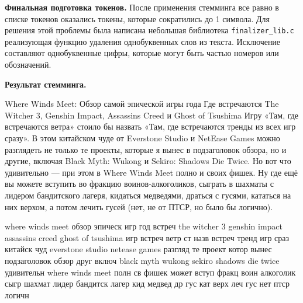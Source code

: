 \vspace{2em}
\noindent\textbf{Финальная подготовка токенов.} После применения стемминга все равно в списке токенов оказались токены, которые сократились до 1 символа. Для решения этой проблемы была написана небольшая библиотека \texttt{finalizer\_lib.c} реализующая функцию удаления однобуквенных слов из текста. Исключение составляют однобуквенные цифры, которые могут быть частью номеров или обозначений.

\vspace{2em}
\noindent\textbf{Результат стемминга.}
\begin{tcolorbox}[colback=blue!5!white,colframe=blue!75!black]
Where Winds Meet: Обзор самой эпической игры года Где встречаются The Witcher 3, Genshin Impact, Assassins Creed и Ghost of Tsushima Игру «Там, где встречаются ветра» стоило бы назвать «Там, где встречаются тренды из всех игр сразу». В этом китайском чуде от Everstone Studio и NetEase Games можно разглядеть не только те проекты, которые я вынес в подзаголовок обзора, но и другие, включая Black Myth: Wukong и Sekiro: Shadows Die Twice. Но вот что удивительно — при этом в Where Winds Meet полно и своих фишек. Ну где ещё вы можете вступить во фракцию воинов-алкоголиков, сыграть в шахматы с лидером бандитского лагеря, кидаться медведями, драться с гусями, кататься на них верхом, а потом лечить гусей (нет, не от ПТСР, но было бы логично).
\end{tcolorbox}

\bigskip

\begin{tcolorbox}[colback=green!5!white,colframe=green!75!black]
where winds meet обзор эпическ игр год встреч the witcher 3 genshin impact assassins creed ghost of tsushima игр встреч ветр ст назв встреч тренд игр сраз китайск чуд everstone studio netease games разгляд те проект котор вынес подзаголовок обзор друг включ black myth wukong sekiro shadows die twice удивительн where winds meet полн св фишек может вступ фракц воин алкоголик сыгр шахмат лидер бандитск лагер кид медвед др гус кат верх леч гус нет птср логичн
\end{tcolorbox}

\pagebreak

